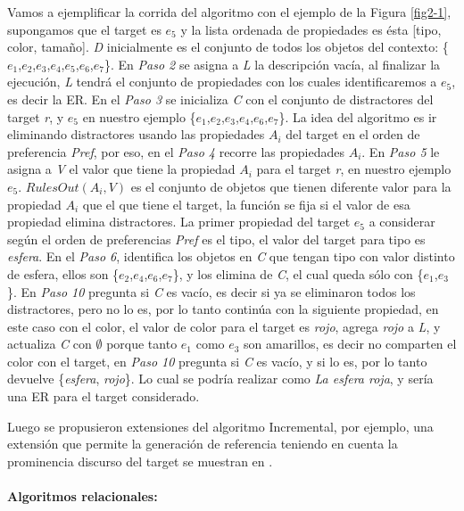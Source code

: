 Vamos a ejemplificar la corrida del algoritmo con el ejemplo de la Figura \ref{fig2-1}, supongamos que el target es $e_{5}$ y la lista 
ordenada de propiedades es \'esta [tipo, color, tama\~no]. \emph{D} inicialmente es el conjunto de todos los objetos del contexto: 
\{$e_{1}$,$e_{2}$,$e_{3}$,$e_{4}$,$e_{5}$,$e_{6}$,$e_{7}$\}.
En {\it Paso 2} se asigna a \emph{L} la descripci\'on vac\'{i}a, al finalizar la ejecuci\'on, \emph{L} tendr\'a el conjunto de propiedades 
con los cuales identificaremos a $e_5$, es decir la ER. En el {\it Paso 3} se inicializa \emph{C} con el conjunto de distractores del target \emph{r}, y $e_5$ en nuestro ejemplo \{$e_{1}$,$e_{2}$,$e_{3}$,$e_{4}$,$e_{6}$,$e_{7}$\}. 
La idea del algoritmo es ir eliminando distractores usando las propiedades $A_{i}$ del target en el orden de preferencia \emph{Pref}, por eso, en el {\it Paso 4} recorre las propiedades $A_{i}$. En {\it Paso 5} 
le asigna a \emph{V} el valor que tiene la propiedad $A_{i}$ para el target \emph{r}, en nuestro ejemplo $e_5$. $RulesOut(A_{i},V)$ es el 
conjunto de objetos que tienen 
diferente valor para la propiedad $A_{i}$ que el que tiene el target, la funci\'on se fija si el valor de esa propiedad elimina distractores. 
La primer propiedad del target $e_5$ a considerar seg\'un el orden de preferencias \emph{Pref} es el tipo, el valor del target para tipo 
es {\it esfera}. En el {\it Paso 6}, identifica los objetos en \emph{C} que tengan tipo con valor distinto de esfera, ellos son \{$e_{2}$,$e_{4}$,$e_{6}$,$e_{7}$\}, y los elimina de \emph{C}, el cual queda s\'olo con \{$e_{1}$,$e_{3}$\}. En {\it Paso 10} pregunta si \emph{C} 
es vac\'io, es decir si ya se eliminaron todos los distractores, pero no lo es, por lo tanto contin\'ua con la siguiente propiedad, 
en este caso con el color, el valor de color para el target es {\it rojo}, agrega {\it rojo} a \emph{L}, y actualiza \emph{C} con 
$\emptyset$ porque tanto $e_{1}$ como $e_{3}$ son amarillos, es decir no comparten el color con el target, en {\it Paso 10} pregunta si \emph{C} es vac\'io, y si lo es, 
por lo tanto devuelve \{{\it esfera}, {\it rojo}\}. Lo cual se podr\'ia realizar como {\it La esfera roja}, y ser\'ia una ER para el target considerado.


Luego se propusieron extensiones del algoritmo Incremental, por ejemplo, una extensi\'on que permite la generaci\'on de referencia teniendo 
en cuenta la prominencia discurso del target se muestran en \cite{Krahmer:2010:EMN:1880370,krahmer}.

\paragraph{Algoritmos relacionales:}

